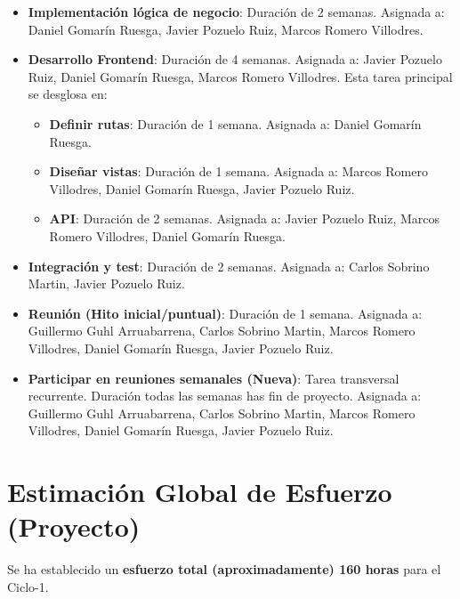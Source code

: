 \documentclass[12pt,a4paper,titlepage]{article}
\begin{document}
\begin{itemize}
    \item \textbf{Implementación lógica de negocio}: Duración de 2 semanas. Asignada a: Daniel Gomarín Ruesga, Javier Pozuelo Ruiz, Marcos Romero Villodres.
    
    \item \textbf{Desarrollo Frontend}: Duración de 4 semanas. Asignada a: Javier Pozuelo Ruiz, Daniel Gomarín Ruesga, Marcos Romero Villodres. Esta tarea principal se desglosa en:
    \begin{itemize}
        \item \textbf{Definir rutas}: Duración de 1 semana. Asignada a: Daniel Gomarín Ruesga.
        \item \textbf{Diseñar vistas}: Duración de 1 semana. Asignada a: Marcos Romero Villodres, Daniel Gomarín Ruesga, Javier Pozuelo Ruiz.
        \item \textbf{API}: Duración de 2 semanas. Asignada a: Javier Pozuelo Ruiz, Marcos Romero Villodres, Daniel Gomarín Ruesga.
    \end{itemize}
    
    \item \textbf{Integración y test}: Duración de 2 semanas. Asignada a: Carlos Sobrino Martin, Javier Pozuelo Ruiz.
    
    \item \textbf{Reunión (Hito inicial/puntual)}: Duración de 1 semana. Asignada a: Guillermo Guhl Arruabarrena, Carlos Sobrino Martin, Marcos Romero Villodres, Daniel Gomarín Ruesga, Javier Pozuelo Ruiz.
    
    \item \textbf{Participar en reuniones semanales (Nueva)}: Tarea transversal recurrente. Duración todas las semanas has fin de proyecto. Asignada a: Guillermo Guhl Arruabarrena, Carlos Sobrino Martin, Marcos Romero Villodres, Daniel Gomarín Ruesga, Javier Pozuelo Ruiz.
\end{itemize}

\vspace{0.5cm}

\newpage

\section{Estimación Global de Esfuerzo (Proyecto)}

Se ha establecido un \textbf{esfuerzo total (aproximadamente) 160 horas} para el Ciclo-1.
\vspace{0.5cm}
\end{document}
